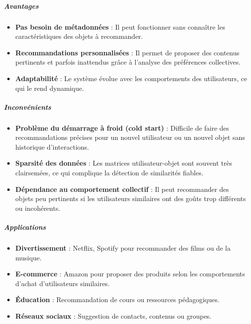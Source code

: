 \documentclass{article}
\begin{document}
    \subparagraph{Avantages}
    \begin{itemize}
        \item \textbf{Pas besoin de métadonnées} : Il peut fonctionner sans connaître les caractéristiques des objets à recommander.
        \item \textbf{Recommandations personnalisées} : Il permet de proposer des contenus pertinents et parfois inattendus grâce à l’analyse des préférences collectives.
        \item \textbf{Adaptabilité} : Le système évolue avec les comportements des utilisateurs, ce qui le rend dynamique.
    \end{itemize}

    \subparagraph{Inconvénients}
    \begin{itemize}
        \item \textbf{Problème du démarrage à froid (cold start)} : Difficile de faire des recommandations précises pour un nouvel utilisateur ou un nouvel objet sans historique d'interactions.
        \item \textbf{Sparsité des données} : Les matrices utilisateur-objet sont souvent très clairsemées, ce qui complique la détection de similarités fiables.
        \item \textbf{Dépendance au comportement collectif} : Il peut recommander des objets peu pertinents si les utilisateurs similaires ont des goûts trop différents ou incohérents.
    \end{itemize}

    \subparagraph{Applications}
    \begin{itemize}
        \item \textbf{Divertissement} : Netflix, Spotify pour recommander des films ou de la musique.
        \item \textbf{E-commerce} : Amazon pour proposer des produits selon les comportements d’achat d’utilisateurs similaires.
        \item \textbf{Éducation} : Recommandation de cours ou ressources pédagogiques.
        \item \textbf{Réseaux sociaux} : Suggestion de contacts, contenus ou groupes.
    \end{itemize}
\end{document}
